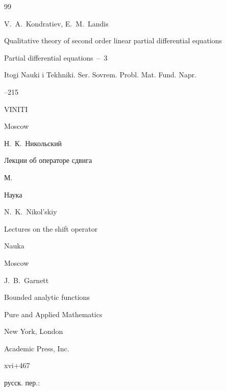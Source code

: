 \begin{thebibliography}{99}



\misctransl

\by V.~A.~Kondratiev, E.~M.~Landis

\paper Qualitative theory of second order linear partial differential equations

\inbook Partial differential equations~--~3

\serial Itogi Nauki i Tekhniki. Ser. Sovrem. Probl. Mat. Fund. Napr.



--215

\publ VINITI

\publaddr Moscow






\by Н.~К.~Никольский

\book Лекции об операторе сдвига

\publaddr М.

\publ Наука



\misctransl

\by N.~K.~Nikol'skiy

\book Lectures on the shift operator

\publ Nauka

\publaddr Moscow








\by J.~B.~Garnett

\book Bounded analytic functions

\serial Pure and Applied Mathematics


\publaddr New York, London

\publ Academic Press, Inc.


\totalpages xvi+467

\rtransl русск. пер.:~


\end{thebibliography}
